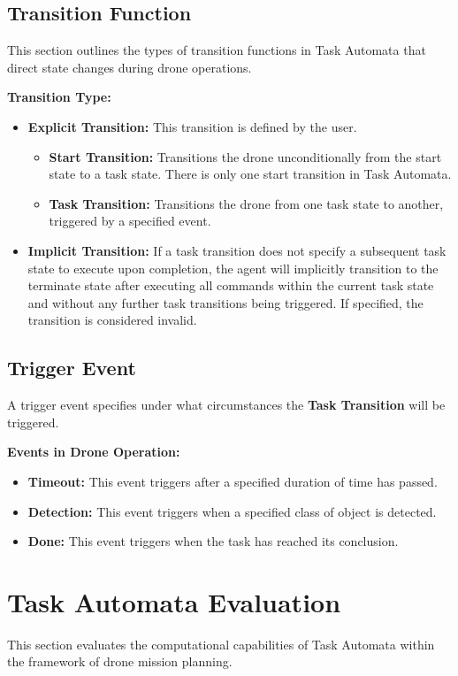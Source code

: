 \subsection{Transition Function}
This section outlines the types of transition functions in Task Automata that direct state changes during drone operations.

\textbf{Transition Type:}
\begin{itemize}
    \item \textbf{Explicit Transition:} This transition is defined by the user.
    \begin{itemize}
        \item \textbf{Start Transition:} Transitions the drone unconditionally from the start state to a task state. There is only one start transition in Task Automata.
        \item \textbf{Task Transition:} Transitions the drone from one task state to another, triggered by a specified event.
    \end{itemize}

    \item \textbf{Implicit Transition:} If a task transition does not specify a subsequent task state to execute upon completion, the agent will implicitly transition to the terminate state after executing all commands within the current task state and without any further task transitions being triggered. If specified, the transition is considered invalid.
\end{itemize}

\subsection{Trigger Event}
A trigger event specifies under what circumstances the \textbf{Task Transition} will be triggered.

\textbf{Events in Drone Operation:}
\begin{itemize}
    \item \textbf{Timeout:} This event triggers after a specified duration of time has passed.
    \item \textbf{Detection:} This event triggers when a specified class of object is detected.
    \item \textbf{Done:} This event triggers when the task has reached its conclusion.
\end{itemize}


\section{Task Automata Evaluation}
This section evaluates the computational capabilities of Task Automata within the framework of drone mission planning.

